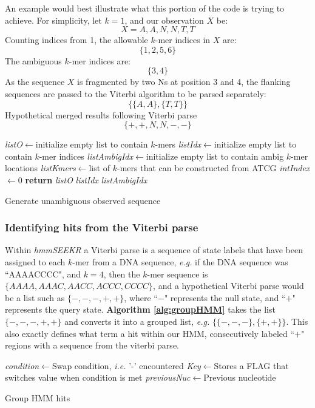 An example would best illustrate what this portion of the code is trying to achieve. For simplicity, let $k=1$, and our observation $X$ be: 
$$X= A,A,N,N,T,T$$
Counting indices from 1, the allowable $k$-mer indices in $X$ are:
$$\{1,2,5,6\}$$
The ambiguous $k$-mer indices are:
$$\{3,4\}$$
As the sequence $X$ is fragmented by two Ns at position 3 and 4, the flanking sequences are passed to the Viterbi algorithm to be parsed separately:
$$\{\{A,A\},\{T,T\}\}$$
Hypothetical merged results following Viterbi parse
$$\{+,+,N,N,-,-\}$$
\begin{algorithm}[h]
\DontPrintSemicolon
{}
\SetAlgoLined
{}
\emph{listO}$\leftarrow$initialize empty list to contain $k$-mers\;
\emph{listIdx}$\leftarrow$initialize empty list to contain $k$-mer indices\;
\emph{listAmbigIdx}$\leftarrow$initialize empty list to contain ambig $k$-mer locations\;
\emph{listKmers}$\leftarrow$list of $k$-mers that can be constructed from ATCG\;
\emph{intIndex}$\leftarrow$0\;
 \textbf{return} \emph{listO} \emph{listIdx} \emph{listAmbigIdx}\;
 \caption{Generate unambiguous observed sequence}
 \label{alg:ambigIdx}
\end{algorithm}

\subsubsection{Identifying hits from the Viterbi parse}
Within \emph{hmmSEEKR} a Viterbi parse is a sequence of state labels that have been assigned to each $k$-mer from a DNA sequence, \emph{e.g.} if the DNA sequence was ``AAAACCCC", and $k=4$, then the $k$-mer sequence is $\{AAAA,AAAC,AACC,ACCC,CCCC\}$, and a hypothetical Viterbi parse would be a list such as $\{-,-,-,+,+\}$, where ``$-$" represents the null state, and ``$+$" represents the query state. \textbf{Algorithm \ref{alg:groupHMM}} takes the list $\{-,-,-,+,+\}$ and converts it into a grouped list, \emph{e.g.} $\{\{-,-,-\},\{+,+\}\}$. This also exactly defines what term a hit within our HMM, consecutively labeled ``$+$" regions with a sequence from the viterbi parse.
\begin{algorithm}[h]
\DontPrintSemicolon
{}
\SetAlgoLined
{}
\emph{condition}$\leftarrow$Swap condition, \emph{i.e.} '-' encountered\;
\emph{Key}$\leftarrow$Stores a FLAG that switches value when condition is met\;
\emph{previousNuc}$\leftarrow$Previous nucleotide\;
 \caption{Group HMM hits}
 \label{alg:groupHMM}
\end{algorithm}

